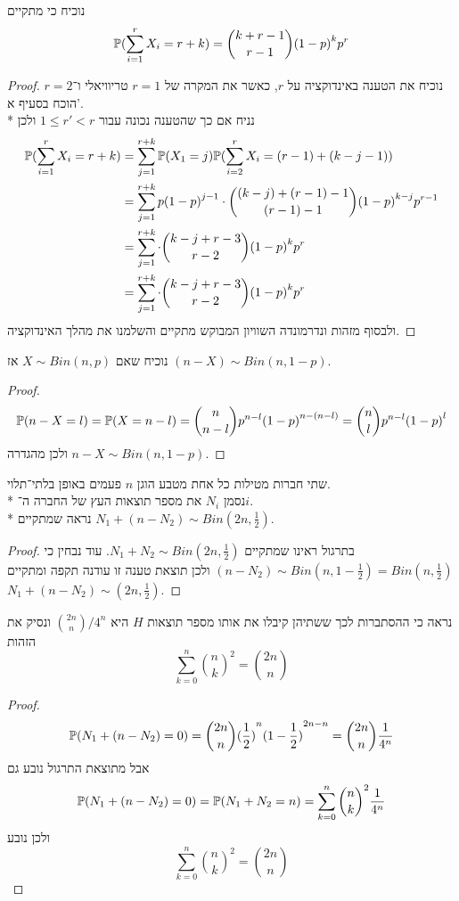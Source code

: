 \subquestion{}
נוכיח כי מתקיים
\[
	\mathbb{P}(\sum_{i = 1}^{r} X_i = r + k)
	= \binom{k + r - 1}{r - 1} {(1 - p)}^k p^r
\]
\begin{proof}
	נוכיח את הטענה באינדוקציה על $r$, כאשר את המקרה של $r = 1$ טריוויאלי ו־$r = 2$ הוכח בסעיף א'. \\*
	נניח אם כך שהטענה נכונה עבור $1 \le r' < r$ ולכן
	\begin{align*}
		\mathbb{P}(\sum_{i = 1}^{r} X_i = r + k)
		& = \sum_{j = 1}^{r + k} \mathbb{P}(X_1 = j) \mathbb{P}(\sum_{i = 2}^{r} X_i = (r - 1) + (k - j - 1)) \\
		& = \sum_{j = 1}^{r + k} p {(1 - p)}^{j - 1} \cdot \binom{(k - j) + (r - 1) - 1}{(r - 1) - 1} {(1 - p)}^{k - j} p^{r - 1} \\
		& = \sum_{j = 1}^{r + k} \cdot \binom{k - j + r - 3}{r - 2} {(1 - p)}^k p^r \\
		& = \sum_{j = 1}^{r + k} \cdot \binom{k - j + r - 3}{r - 2} {(1 - p)}^k p^r \\
	\end{align*}
	ולבסוף מזהות ונדרמונדה השוויון המבוקש מתקיים והשלמנו את מהלך האינדוקציה. 
\end{proof}

\question{}
\subquestion{}
נוכיח שאם $X \sim Bin(n, p)$ אז $(n - X) \sim Bin(n, 1 - p)$.
\begin{proof}
	\[
		\mathbb{P}(n - X = l)
		= \mathbb{P}(X = n - l)
		= \binom{n}{n - l} p^{n - l} {(1 - p)}^{n - (n - l)}
		= \binom{n}{l} p^{n - l} {(1 - p)}^{l}
	\]
	ולכן מהגדרה $n - X \sim Bin(n, 1 - p)$.
\end{proof}

\subquestion{}
שתי חברות מטילות כל אחת מטבע הוגן $n$ פעמים באופן בלתי־תלוי. \\*
נסמן $N_i$ את מספר תוצאות העץ של החברה ה־$i$. \\*
נראה שמתקיים $N_1 + (n - N_2) \sim Bin(2n, \frac{1}{2})$.
\begin{proof}
	בתרגול ראינו שמתקיים $N_1 + N_2 \sim Bin(2n, \frac{1}{2})$.
	עוד נבחין כי $(n - N_2) \sim Bin(n, 1 - \frac{1}{2}) = Bin(n, \frac{1}{2})$ ולכן תוצאת טענה זו עודנה תקפה ומתקיים $N_1 + (n - N_2) \sim (2n, \frac{1}{2})$.
\end{proof}

\subquestion{}
נראה כי ההסתברות לכך ששתיהן קיבלו את אותו מספר תוצאות $H$ היא $\binom{2n}{n} / 4^n$ ונסיק את הזהות
\[
	\sum_{k = 0}^{n} {\binom{n}{k}}^2 = \binom{2n}{n}
\]
\begin{proof}
	\[
		\mathbb{P}(N_1 + (n - N_2) = 0)
		= \binom{2n}{n} {(\frac{1}{2})}^n {(1 - \frac{1}{2})}^{2n - n}
		= \binom{2n}{n} \frac{1}{4^n}
	\]
	אבל מתוצאת התרגול נובע גם
	\[
		\mathbb{P}(N_1 + (n - N_2) = 0)
		= \mathbb{P}(N_1 + N_2 = n)
		= \sum_{k = 0}^{n} {\binom{n}{k}}^2 \frac{1}{4^n}
	\]
	ולכן נובע
	\[
		\sum_{k = 0}^{n} {\binom{n}{k}}^2 = \binom{2n}{n}
	\]
\end{proof}


